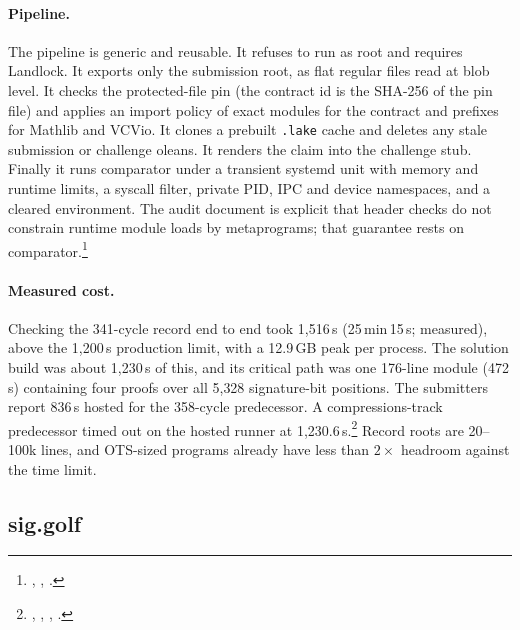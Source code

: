 \paragraph{Pipeline.} The pipeline is generic and reusable. It refuses to run as root and requires
Landlock. It exports only the submission root, as flat regular files read at blob level. It checks
the protected-file pin (the contract id is the SHA-256 of the pin file) and applies an import
policy of exact modules for the contract and prefixes for Mathlib and VCVio. It clones a prebuilt
\texttt{.lake} cache and deletes any stale submission or challenge oleans. It renders the claim
into the challenge stub. Finally it runs comparator under a transient systemd unit with memory and
runtime limits, a syscall filter, private PID, IPC and device namespaces, and a cleared
environment. The audit document is explicit that header checks do not constrain runtime module
loads by metaprograms; that guarantee rests on comparator.\footnote{,
, .}

\paragraph{Measured cost.} Checking the 341-cycle record end to end took 1{,}516\,s
(25\,min\,15\,s; measured), above the 1{,}200\,s production limit, with a 12.9\,GB peak per
process. The solution build was about 1{,}230\,s of this, and its critical path was one 176-line
module (472\,s) containing four  proofs over all 5{,}328 signature-bit
positions. The submitters report 836\,s hosted for the 358-cycle predecessor. A compressions-track
predecessor timed out on the hosted runner at 1{,}230.6\,s.\footnote{,
, ,
.} Record roots are 20--100k lines, and OTS-sized
programs already have less than $2\times$ headroom against the time limit.

\subsection{sig.golf}\label{subsec:prior-sig}

